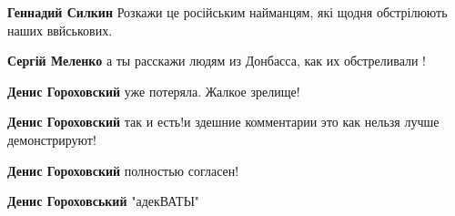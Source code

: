 \begin{itemize}
\begin{itemize}
\begin{itemize}
 
\textbf{Геннадий Силкин} Розкажи це російським найманцям, які щодня обстрілюють наших ввйськових.

 
\textbf{Сергій Меленко} а ты расскажи людям из Донбасса, как их обстреливали !
\end{itemize}

 
\textbf{Денис Гороховский} уже потеряла. Жалкое зрелище!

 
\textbf{Денис Гороховский} так и есть!и здешние комментарии это как нельзя лучше демонстрируют!

 
\textbf{Денис Гороховский} полностью согласен!

 
\textbf{Денис Гороховський} "адекВАТЫ"

 

\end{itemize}
\end{itemize}
